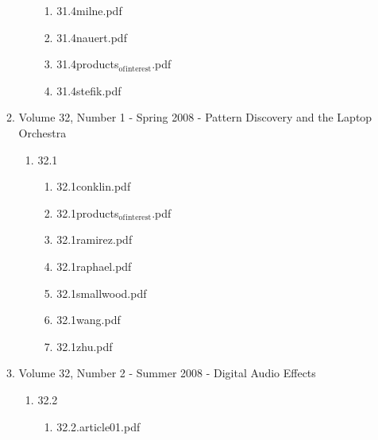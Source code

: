 \documentclass[11pt]{article}
\begin{document}
\begin{enumerate}
\begin{enumerate}
\begin{enumerate}
\begin{enumerate}
\item 31.4milne.pdf
\label{sec-1-1-1-1-11-19-19-9-1-2}

\item 31.4nauert.pdf
\label{sec-1-1-1-1-11-19-19-9-1-3}

\item 31.4products$_{\text{of}}$$_{\text{interest}}$.pdf
\label{sec-1-1-1-1-11-19-19-9-1-4}

\item 31.4stefik.pdf
\label{sec-1-1-1-1-11-19-19-9-1-5}
\end{enumerate}
\end{enumerate}

\item Volume 32, Number 1 - Spring 2008 - Pattern Discovery and the Laptop Orchestra
\label{sec-1-1-1-1-11-19-19-10}
\begin{enumerate}
\item 32.1
\label{sec-1-1-1-1-11-19-19-10-1}
\begin{enumerate}
\item 32.1conklin.pdf
\label{sec-1-1-1-1-11-19-19-10-1-1}

\item 32.1products$_{\text{of}}$$_{\text{interest}}$.pdf
\label{sec-1-1-1-1-11-19-19-10-1-2}

\item 32.1ramirez.pdf
\label{sec-1-1-1-1-11-19-19-10-1-3}

\item 32.1raphael.pdf
\label{sec-1-1-1-1-11-19-19-10-1-4}

\item 32.1smallwood.pdf
\label{sec-1-1-1-1-11-19-19-10-1-5}

\item 32.1wang.pdf
\label{sec-1-1-1-1-11-19-19-10-1-6}

\item 32.1zhu.pdf
\label{sec-1-1-1-1-11-19-19-10-1-7}
\end{enumerate}
\end{enumerate}

\item Volume 32, Number 2 - Summer 2008 - Digital Audio Effects
\label{sec-1-1-1-1-11-19-19-11}
\begin{enumerate}
\item 32.2
\label{sec-1-1-1-1-11-19-19-11-1}
\begin{enumerate}
\item 32.2.article01.pdf
\label{sec-1-1-1-1-11-19-19-11-1-1}


\end{enumerate}
\end{enumerate}
\end{enumerate}
\end{enumerate}
\end{document}
